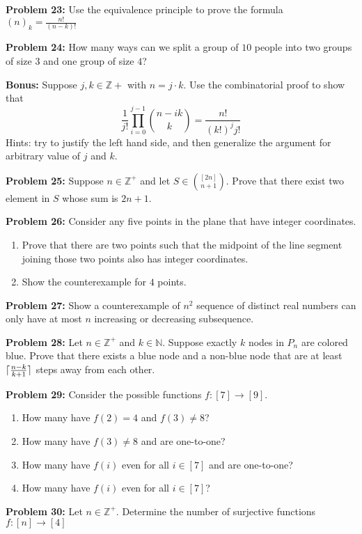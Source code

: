 \documentclass[12pt]{article}
\newcommand{\prob}[1]{\textbf{Problem #1:}}
\DeclarePairedDelimiter{\ceil}{\lceil}{\rceil} %
\begin{document}
\prob{23} Use the equivalence principle to prove the formula $(n)_k = \frac{n!}{(n-k)!}$

\prob{24} How many ways can we split a group of $10$ people into two groups of size $3$ and one group of size $4$?

\textbf{Bonus:} Suppose $j, k \in \mathbb{Z}+$ with $n=j\cdot k$. Use the combinatorial proof to show that $$\frac{1}{j!} \prod\limits^{j-1}_{i=0} \binom{n-ik}{k} = \frac{n!}{(k!)^j j!}$$ Hints: try to justify the left hand side, and then generalize the argument for arbitrary value of $j$ and $k$.

\prob{25} Suppose $n \in \mathbb{Z}^+$ and let $S \in \binom{[2n]}{n+1}$. Prove that there exist two element in $S$ whose sum is $2n+1$.

\prob{26} Consider any five points in the plane that have integer coordinates.

\begin{enumerate}[label=(\alph*)]
    \item Prove that there are two points such that the midpoint of the line segment joining those two points also has integer coordinates.
    \item Show the counterexample for $4$ points.
\end{enumerate}

\prob{27} Show a counterexample of $n^2$ sequence of distinct real numbers can only have at most $n$ increasing or decreasing subsequence.

\prob{28} Let $n \in \mathbb{Z}^+$ and $k \in \mathbb{N}$. Suppose exactly $k$ nodes in $P_n$ are colored blue. Prove that there exists a blue node and a non-blue node that are at least $\ceil{\frac{n-k}{k+1}}$ steps away from each other.

\prob{29} Consider the possible functions $f: [7] \to [9]$.

\begin{enumerate}[label=(\alph*)]
    \item How many have $f(2) = 4$ and $f(3) \neq  8$?
    \item How many have $f(3) \neq 8$ and are one-to-one?
    \item How many have $f(i)$ even for all $i \in [7]$ and are one-to-one?
    \item How many have $f(i)$ even for all $i \in [7]$?
\end{enumerate}

\prob{30} Let $n \in \mathbb{Z}^+$. Determine the number of surjective functions $f: [n] \to [4]$
\end{document}
